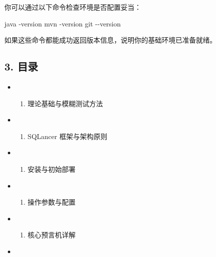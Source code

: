 \documentclass[
]{article}
\newenvironment{Shaded}{}{}
\newcommand{\AttributeTok}[1]{\textcolor[rgb]{0.49,0.56,0.16}{#1}}
\newcommand{\ExtensionTok}[1]{#1}
\newcommand{\FunctionTok}[1]{\textcolor[rgb]{0.02,0.16,0.49}{#1}}
\providecommand{\tightlist}{%
  \setlength{\itemsep}{0pt}\setlength{\parskip}{0pt}}
\begin{document}
你可以通过以下命令检查环境是否配置妥当：

\begin{Shaded}
\begin{Highlighting}[]
\ExtensionTok{java} \AttributeTok{{-}version}
\ExtensionTok{mvn} \AttributeTok{{-}version}
\FunctionTok{git} \AttributeTok{{-}{-}version}
\end{Highlighting}
\end{Shaded}

如果这些命令都能成功返回版本信息，说明你的基础环境已准备就绪。

\subsection{3. 目录}\label{ux76eeux5f55}

\begin{itemize}
\tightlist
\item
  \begin{enumerate}
  \def\labelenumi{\arabic{enumi}.}
  \setcounter{enumi}{3}
  \tightlist
  \item
    理论基础与模糊测试方法
  \end{enumerate}
\item
  \begin{enumerate}
  \def\labelenumi{\arabic{enumi}.}
  \setcounter{enumi}{4}
  \tightlist
  \item
    SQLancer 框架与架构原则
  \end{enumerate}
\item
  \begin{enumerate}
  \def\labelenumi{\arabic{enumi}.}
  \setcounter{enumi}{5}
  \tightlist
  \item
    安装与初始部署
  \end{enumerate}
\item
  \begin{enumerate}
  \def\labelenumi{\arabic{enumi}.}
  \setcounter{enumi}{6}
  \tightlist
  \item
    操作参数与配置
  \end{enumerate}
\item
  \begin{enumerate}
  \def\labelenumi{\arabic{enumi}.}
  \setcounter{enumi}{7}
  \tightlist
  \item
    核心预言机详解
  \end{enumerate}
\item
  \begin{enumerate}
  \def\labelenumi{\arabic{enumi}.}
  \setcounter{enumi}{8}

\end{enumerate}
\end{itemize}
\end{document}
